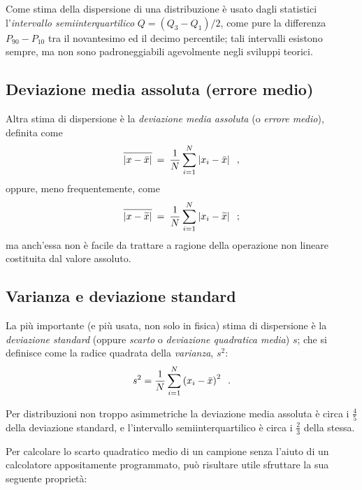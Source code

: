 Come stima della dispersione di una distribuzione \`e usato
dagli statistici l'\emph{intervallo semiinterquartilico} $Q
= (Q_3 - Q_1) / 2$, come pure la differenza $P_{90} -
P_{10}$ tra il novantesimo ed il decimo percentile; tali
intervalli esistono sempre, ma non sono padroneggiabili
agevolmente negli sviluppi teorici.%

\subsection{Deviazione media assoluta (errore medio)}%
%
Altra stima di dispersione \`e la \emph{deviazione media
  assoluta} (o \emph{errore medio}), definita come
\begin{equation*}
  \overline{ \rule{0pt}{2.0ex} | x - \bar x | } \: =
  \: \frac{1}{N}\sum_{i=1}^N \left| x_i - \bar x \right| \peq
  ,
\end{equation*}
oppure, meno frequentemente, come
\begin{equation*}
  \overline{ \rule{0pt}{2.0ex} | x - \widetilde x | } \: = \:
  \frac{1}{N}\sum_{i=1}^N \left| x_i - \widetilde x \right|
  \peq ;
\end{equation*}
ma anch'essa non \`e facile da trattare a ragione della
operazione non lineare costituita dal valore assoluto.%

\subsection{Varianza e deviazione standard}%
%
La pi\`u importante (e pi\`u usata, non solo in fisica)
stima di dispersione \`e la \emph{deviazione standard}
(oppure \emph{scarto} o \emph{deviazione quadratica media})
$s$; che si definisce come la radice quadrata della
\emph{varianza}, $s^2$:
\begin{equation*}
  s^2 = \frac{1}{N} \sum_{i=1}^N \left( x_i
    - \bar x \right) ^2 \;\; .
\end{equation*}

Per distribuzioni non troppo asimmetriche la deviazione
media assoluta \`e circa i $\frac{4}{5}$ della deviazione
standard, e l'intervallo semiinterquartilico \`e circa i
$\frac{2}{3}$ della stessa.

Per calcolare lo scarto quadratico medio di un campione
senza l'aiuto di un calcolatore appositamente programmato,
pu\`o risultare utile sfruttare la sua seguente propriet\`a:

